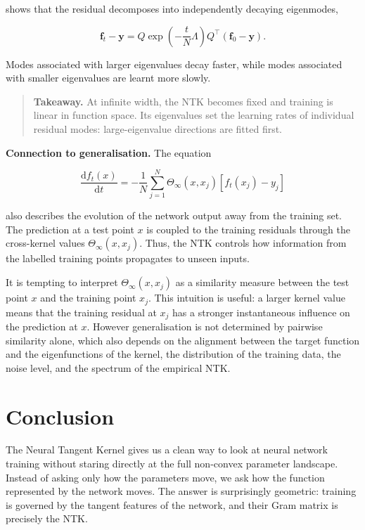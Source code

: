 shows that the residual decomposes into independently decaying eigenmodes,

\[
\mathbf{f}_t-\mathbf{y}
=
Q
\exp\!\left(
-
\frac{t}{N}\Lambda
\right)
Q^\top
\left(
\mathbf{f}_0-\mathbf{y}
\right).
\]

Modes associated with larger eigenvalues decay faster, while modes associated with smaller eigenvalues are learnt more slowly.

\begin{quote}
\textbf{Takeaway.} At infinite width, the NTK becomes fixed and training is linear in function space. Its eigenvalues set the learning rates of individual residual modes: large-eigenvalue directions are fitted first.
\end{quote}

\textbf{Connection to generalisation.} The equation

\[
\frac{\mathrm{d} f_t(x)}{\mathrm{d}t}
=
-
\frac{1}{N}
\sum_{j=1}^{N}
\Theta_\infty(x,x_j)
\left[
f_t(x_j)-y_j
\right]
\]

also describes the evolution of the network output away from the training set. The prediction at a test point \(x\) is coupled to the training residuals through the cross-kernel values \(\Theta_\infty(x,x_j)\). Thus, the NTK controls how information from the labelled training points propagates to unseen inputs.

It is tempting to interpret \(\Theta_\infty(x,x_j)\) as a similarity measure between the test point \(x\) and the training point \(x_j\). This intuition is useful: a larger kernel value means that the training residual at \(x_j\) has a stronger instantaneous influence on the prediction at \(x\). However generalisation is not determined by pairwise similarity alone, which also depends on the alignment between the target function and the eigenfunctions of the kernel, the distribution of the training data, the noise level, and the spectrum of the empirical NTK.

\section{Conclusion}

The Neural Tangent Kernel gives us a clean way to look at neural network training without staring directly at the full non-convex parameter landscape. Instead of asking only how the parameters move, we ask how the function represented by the network moves. The answer is surprisingly geometric: training is governed by the tangent features of the network, and their Gram matrix is precisely the NTK.

